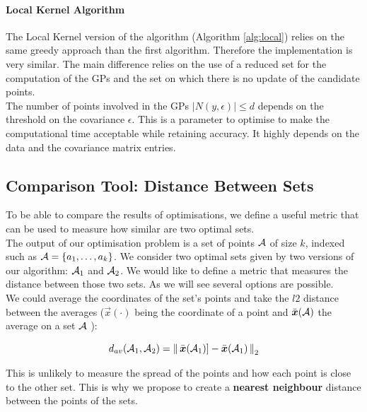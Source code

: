 \paragraph{Local Kernel Algorithm}

The Local Kernel version of the algorithm (Algorithm \ref{alg:local}) relies on the same greedy approach than the first algorithm. Therefore the implementation is very similar. The main difference relies on the use of a reduced set for the computation of the GPs and the set on which there is no update of the candidate points. \\

The number of points involved in the GPs $|N(y,\epsilon)| \leq d $  depends on the threshold on the covariance $\epsilon$. This is a parameter to optimise to make the computational time acceptable while retaining accuracy. It highly depends on the data and the covariance matrix entries. 

\subsection{Comparison Tool: Distance Between Sets}

To be able to compare the results of optimisations, we define a useful metric that can be used to measure how similar are two optimal sets. \\

The output of our optimisation problem is a set of points $\mathcal{A}$ of size $k$, indexed such as $\mathcal{A} = \{a_1, \dots, a_k\}$. We consider two optimal sets given by two versions of our algorithm: $\mathcal{A}_1$ and $\mathcal{A}_2$. We would like to define a metric that measures the distance between those two sets. As we will see several options are possible. \\

We could average the coordinates of the set's points and take the $l2$ distance between the averages ($\vec{x}(\cdot)$ being the coordinate of a point and $\bar{{\boldsymbol{{x}}}}(\mathcal{A})$ the average on a set $\mathcal{A}$  ):

\begin{equation}
    d_{av}(\mathcal{A}_1,\mathcal{A}_2) =  \left\lVert \,\bar{{\boldsymbol{{x}}}}(\mathcal{A}_1)] - \bar{{\boldsymbol{{x}}}}(\mathcal{A}_1)\, \right\rVert_2
\end{equation}

This is unlikely to measure the spread of the points and how each point is close to the other set. This is why we propose to create a \textbf{nearest neighbour} distance between the points of the sets. \\

